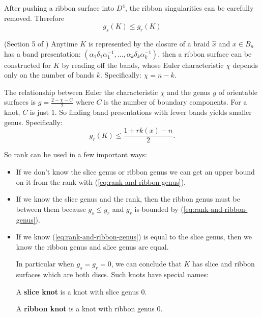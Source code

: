 \documentclass[12pt]{thesis}
\begin{document}
After pushing a ribbon surface into $D^{4}$,
the ribbon singularities can be carefully removed.
Therefore 
\begin{equation}
    \label{eq:slice-and-ribbon-genus}
    g_{s}(K) \leq g_{r}(K)
\end{equation}

\begin{proposition} (Section 5 of \cite{rudolph-braided-surfaces})
    Anytime $K$ is represented by the closure of a braid $\widehat{x}$ 
    and $x \in B_{n}$ has a band presentation: $(\alpha_{1} \delta_{1} \alpha_{1}^{-1}, \ldots, \alpha_{k} \delta_{k} \alpha_{k}^{-1})$,
    then a ribbon surface can be constructed for $K$ by reading off the bands,
    whose Euler characteristic $\chi$ depends only
    on the number of bands $k$.
    Specifically: $\chi = n - k$. 
\end{proposition}

The relationship between Euler the characteristic $\chi$
and the genus $g$ of orientable surfaces is $g = \frac{2 - \chi - C}{2}$ where $C$ is the number
of boundary components. For a knot, $C$ is just $1$.
So finding band presentations with fewer bands yields smaller genus.
Specifically: 
\begin{equation}
    \label{eq:rank-and-ribbon-genus}
    g_{r}(K) \leq \frac{1 + rk(x) - n}{2}.
\end{equation}

So rank can be used in a few important ways:
\begin{itemize}
    \item If we don't know the slice genus or ribbon genus
          we can get an upper bound on it from the rank
          with (\ref{eq:rank-and-ribbon-genus}).

    \item If we know the slice genus and the rank,
          then the ribbon genus must be between them
          because $g_{s} \leq g_{r}$ and $g_{r}$
          is bounded by (\ref{eq:rank-and-ribbon-genus}).

      \item If we know (\ref{eq:rank-and-ribbon-genus}) 
          is equal to the slice genus,
          then we know the ribbon genus and slice genus are equal.

          In particular when $g_{s} = g_{r} = 0$,
          we can conclude that $K$ has slice
          and ribbon surfaces which are both discs.
          Such knots have special names:

          \begin{definition}
              A \textbf{slice knot} is a knot with slice genus 0.
          \end{definition}
          \begin{definition}
              A \textbf{ribbon knot} is a knot with ribbon genus 0.
          \end{definition}
\end{itemize}
\end{document}
